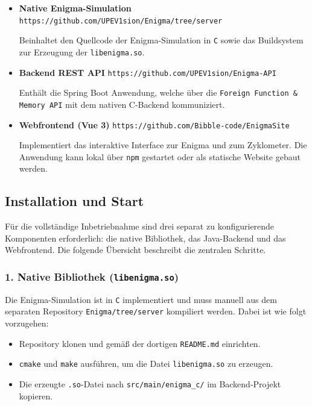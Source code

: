 \documentclass[12pt, ngerman, a4paper, numbers=noenddot]{article}
\begin{document}
\begin{itemize}

	
	\item \textbf{Native Enigma-Simulation}  
	\newline \lstinline|https://github.com/UPEV1sion/Enigma/tree/server|
	
	Beinhaltet den Quellcode der Enigma-Simulation in \lstinline|C| sowie das Buildsystem zur Erzeugung der \lstinline|libenigma.so|.
	
	\item \textbf{Backend REST API}  
	\newline \lstinline|https://github.com/UPEV1sion/Enigma-API|  
	
	Enthält die Spring Boot Anwendung, welche über die \newline\lstinline|Foreign Function & Memory API| mit dem nativen C-Backend kommuniziert.
	
	\item \textbf{Webfrontend (Vue 3)}  
	\newline \lstinline|https://github.com/Bibble-code/EnigmaSite|
	
	Implementiert das interaktive Interface zur Enigma und zum Zyklometer. Die Anwendung kann lokal über \lstinline|npm| gestartet oder als statische Website gebaut werden.
\end{itemize}

\newpage
\subsection*{Installation und Start}

Für die vollständige Inbetriebnahme sind drei separat zu konfigurierende Komponenten erforderlich: die native Bibliothek, das Java-Backend und das Webfrontend. Die folgende Übersicht beschreibt die zentralen Schritte.

\subsubsection*{1. Native Bibliothek (\texttt{libenigma.so})}

Die Enigma-Simulation ist in \lstinline|C| implementiert und muss manuell aus dem separaten Repository \lstinline|Enigma/tree/server| kompiliert werden.  
Dabei ist wie folgt vorzugehen:

\begin{itemize}
	\item Repository klonen und gemäß der dortigen \lstinline|README.md| einrichten.
	\item \lstinline|cmake| und \lstinline|make| ausführen, um die Datei \lstinline|libenigma.so| zu erzeugen.
	\item Die erzeugte \lstinline|.so|-Datei nach \lstinline|src/main/enigma_c/| im Backend-Projekt kopieren.
\end{itemize}
\end{document}
